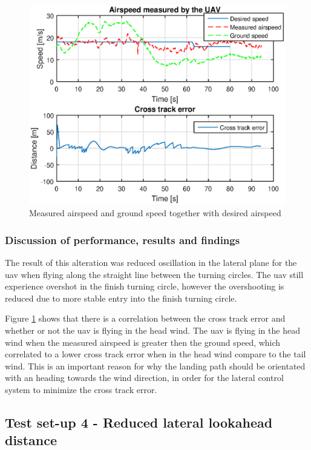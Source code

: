 \begin{figure}[H]
\centering
\includegraphics[scale=0.9]{figs/Experiment/airspeed31mai125420.eps}
\caption{Measured airspeed and ground speed together with desired airspeed}
\label{Fig:Airspeed31mai125420}
\end{figure}
\subsubsection{Discussion of performance, results and findings}
The result of this alteration was reduced oscillation in the lateral plane for the \gls{uav} when flying along the straight line between the turning circles. The \gls{uav} still experience overshot in the finish turning circle, however the overshooting is reduced due to more stable entry into the finish turning circle.

Figure \ref{Fig:Airspeed31mai125420} shows that there is a correlation between the cross track error and whether or not the \gls{uav} is flying in the head wind. The \gls{uav} is flying in the head wind when the measured airspeed is greater then the ground speed, which correlated to a lower cross track error when in the head wind compare to the tail wind. This is an important reason for why the landing path should be orientated with an heading towards the wind direction, in order for the lateral control system to minimize the cross track error.
\subsection{Test set-up 4 - Reduced lateral lookahead distance}\label{ss:Day1:ReducedLookahead}
